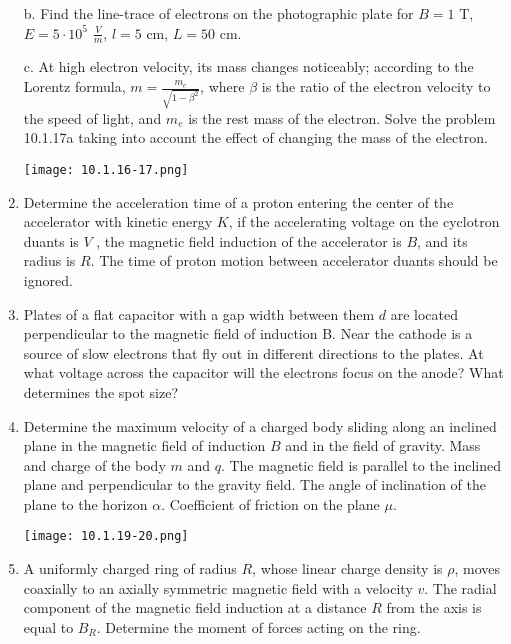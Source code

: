 \documentclass{article}
\begin{document}
\begin{enumerate}[label=10.1.\arabic*]
b. Find the line-trace of electrons on the photographic plate for $B = 1$ T, $E = 5 \cdot 10^5$ $\frac{V}{m}$, $l = 5$ cm, $L = 50$ cm. 

c. At high electron velocity, its mass changes noticeably; according to the Lorentz formula, $m = \frac{m_e}{\sqrt{1 - \beta^2}}$, where $\beta$ is the ratio of the electron velocity to the speed of light, and $m_e$ is the rest mass of the electron. Solve the problem 10.1.17a taking into account the effect of changing the mass of the electron.

\begin{center}
    \texttt{[image: 10.1.16-17.png]}
\end{center}

\item Determine the acceleration time of a proton entering the center of the accelerator with kinetic energy $K$, if the accelerating voltage on the cyclotron duants is $V$ , the magnetic field induction of the accelerator is $B$, and its radius is $R$. The time of proton motion between accelerator duants should be ignored.

\item Plates of a flat capacitor with a gap width between them $d$ are located perpendicular to the magnetic field of induction B. Near the cathode is a source of slow electrons that fly out in different directions to the plates. At what voltage across the capacitor will the electrons focus on the anode? What determines the spot size?

\item Determine the maximum velocity of a charged body sliding along an inclined plane in the magnetic field of induction $B$ and in the field of gravity. Mass and charge of the body $m$ and $q$. The magnetic field is parallel to the inclined plane and perpendicular to the gravity field. The angle of inclination of the plane to the horizon $\alpha$. Coefficient of friction on the plane $\mu$.

\begin{center}
    \texttt{[image: 10.1.19-20.png]}
\end{center}

\item A uniformly charged ring of radius $R$, whose linear charge density is $\rho$, moves coaxially to an axially symmetric magnetic field with a velocity $v$. The radial component of the magnetic field induction at a distance $R$ from the axis is equal to $B_R$. Determine the moment of forces acting on the ring.


\end{enumerate}
\end{document}
